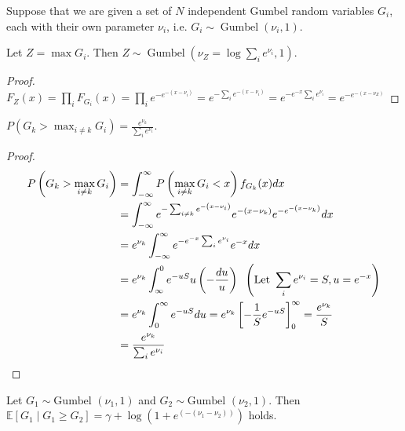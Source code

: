 Suppose that we are given a set of $N$ independent Gumbel random variables $G_i$, each with their own parameter $\nu_i$, i.e. $G_i \sim \operatorname{Gumbel}\left(\nu_i, 1\right)$.

\begin{lem}\label{lem:GumbelMax}
    Let $Z=\max G_i$. Then $Z \sim \operatorname{Gumbel}\left(\nu_Z=\log \sum_{i} e^{\nu_i}, 1\right)$.
\end{lem}
\begin{proof}
    $F_Z(x)=\prod_{i} F_{G_i}(x)=\prod_{i} e^{-e^{-\left(x-\nu_i\right)}}=e^{-\sum_{i} e^{-\left(x-\nu_i\right)}}=e^{-e^{-x} \sum_{i} e^{\nu_i}}=e^{-e^{-\left(x-\nu_Z\right)}}$
\end{proof}

\begin{cor}\label{cor:GumbelOptProb}
    $P\left(G_k>\max _{i \neq k} G_i\right)=\frac{e^{\nu_k}}{\sum_{i} e^{\nu_i}}$.
\end{cor}
\begin{proof}
\begin{align}
    P\left(G_k>\max _{i \neq k} G_i\right)&=\int_{-\infty}^{\infty} P\left(\max _{i \neq k} G_i<x\right) f_{G_{k}}(x) d x\notag
    \\&=\int_{-\infty}^{\infty} e^{-\sum_{i \neq k} e^{-\left(x-\nu_i\right)}} e^{-\left(x-\nu_k\right)} e^{-e^{-\left(x-\nu_k\right)}} d x \notag
    \\&=e^{\nu_k} \int_{-\infty}^{\infty} e^{-e^{-x} \sum_{i} e^{\nu_i}} e^{-x} d x \notag
    \\&=e^{\nu_k}\int_{\infty}^0 e^{-u S} u\left(-\frac{d u}{u}\right)  \; \; \left(\text{Let } \sum_{i} e^{\nu_i}=S, u=e^{-x}\right)\notag
    \\&=e^{\nu_k}\int_0^{\infty} e^{-u S} d u=e^{\nu_k}\left[-\frac{1}{S} e^{-u S}\right]_0^{\infty} = \frac{e^{\nu_k}}{S}\notag 
    \\&=\frac{e^{\nu_k}}{\sum_{i} e^{\nu_i}} \notag
\end{align}
\end{proof}

\begin{lem}\label{lem:ExpofLargerGumbel}
    Let $G_1\sim \text{Gumbel }(\nu_1, 1)$ and $G_2\sim \text{Gumbel }(\nu_2, 1)$. Then $\mathbb{E}\left[G_1 \mid G_1\geq G_2\right]=\gamma + \log \left( 1+ e^{\left(-(\nu_1-\nu_2)\right)} \right)$ holds. 
\end{lem}

